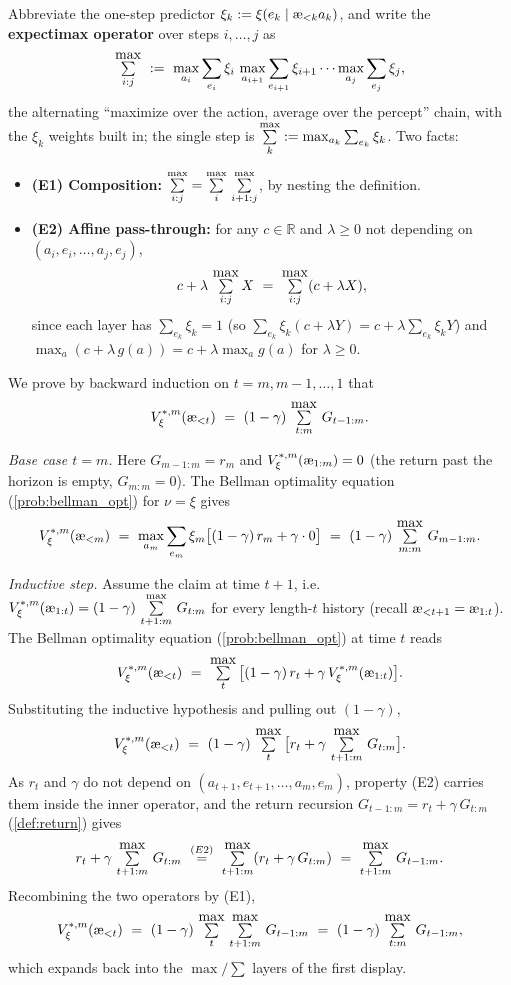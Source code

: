 \documentclass[fontsize=11pt, parskip=half]{scrartcl}
\newcommand{\exmaxsym}{\mathop{\mathchoice
  {\overset{\textstyle\max}{\textstyle\sum}}%
  {\overset{\max}{\sum}}%
  {\overset{\scriptstyle\max}{\scriptstyle\sum}}%
  {\overset{\scriptscriptstyle\max}{\scriptscriptstyle\sum}}}}
\newcommand{\exmax}{\exmaxsym\limits}
\newcommand{\aes}{\textnormal{\ae}}
\begin{document}
\begin{solution}
Abbreviate the one-step predictor $\xi_k := \xi(e_k \mid \aes_{<k} a_k)$, and write the \textbf{expectimax operator} over steps $i, \ldots, j$ as
\[
    \exmax_{i:j} ~:=~ \max_{a_i} \sum_{e_i} \xi_i\, \max_{a_{i+1}} \sum_{e_{i+1}} \xi_{i+1} \cdots \max_{a_j} \sum_{e_j} \xi_j,
\]
the alternating ``maximize over the action, average over the percept'' chain, with the $\xi_k$ weights built in; the single step is $\exmax_k := \max_{a_k} \sum_{e_k} \xi_k$. Two facts:
\begin{itemize}\itemsep=2pt
    \item \textbf{(E1) Composition:} $\exmax_{i:j} = \exmax_i\, \exmax_{i+1:j}$, by nesting the definition.
    \item \textbf{(E2) Affine pass-through:} for any $c \in \mathbb{R}$ and $\lambda \geq 0$ not depending on $(a_i, e_i, \ldots, a_j, e_j)$,
    \[
        c + \lambda\, \exmax_{i:j} X ~=~ \exmax_{i:j}(c + \lambda X),
    \]
    since each layer has $\sum_{e_k} \xi_k = 1$ (so $\sum_{e_k}\xi_k(c+\lambda Y) = c + \lambda \sum_{e_k}\xi_k Y$) and $\max_a(c + \lambda\, g(a)) = c + \lambda \max_a g(a)$ for $\lambda \geq 0$.
\end{itemize}

We prove by backward induction on $t = m, m-1, \ldots, 1$ that
\[
    V_\xi^{*,m}(\aes_{<t}) ~=~ (1-\gamma)\, \exmax_{t:m}\, G_{t-1:m}.
\]

\emph{Base case $t = m$.} Here $G_{m-1:m} = r_m$ and $V_\xi^{*,m}(\aes_{1:m}) = 0$ (the return past the horizon is empty, $G_{m:m} = 0$). The Bellman optimality equation (\cref{prob:bellman_opt}) for $\nu = \xi$ gives
\[
    V_\xi^{*,m}(\aes_{<m}) ~=~ \max_{a_m} \sum_{e_m} \xi_m \big[(1-\gamma)\, r_m + \gamma \cdot 0\big] ~=~ (1-\gamma)\, \exmax_{m:m}\, G_{m-1:m}.
\]

\emph{Inductive step.} Assume the claim at time $t+1$, i.e.\ $V_\xi^{*,m}(\aes_{1:t}) = (1-\gamma)\, \exmax_{t+1:m}\, G_{t:m}$ for every length-$t$ history (recall $\aes_{<t+1} = \aes_{1:t}$). The Bellman optimality equation (\cref{prob:bellman_opt}) at time $t$ reads
\[
    V_\xi^{*,m}(\aes_{<t}) ~=~ \exmax_t \big[(1-\gamma)\, r_t + \gamma\, V_\xi^{*,m}(\aes_{1:t})\big].
\]
Substituting the inductive hypothesis and pulling out $(1-\gamma)$,
\[
    V_\xi^{*,m}(\aes_{<t}) ~=~ (1-\gamma)\, \exmax_t \big[r_t + \gamma\, \exmax_{t+1:m}\, G_{t:m}\big].
\]
As $r_t$ and $\gamma$ do not depend on $(a_{t+1}, e_{t+1}, \ldots, a_m, e_m)$, property (E2) carries them inside the inner operator, and the return recursion $G_{t-1:m} = r_t + \gamma\, G_{t:m}$ (\cref{def:return}) gives
\[
    r_t + \gamma\, \exmax_{t+1:m}\, G_{t:m} ~\overset{(E2)}{=}~ \exmax_{t+1:m}(r_t + \gamma\, G_{t:m}) ~=~ \exmax_{t+1:m}\, G_{t-1:m}.
\]
Recombining the two operators by (E1),
\[
    V_\xi^{*,m}(\aes_{<t}) ~=~ (1-\gamma)\, \exmax_t\, \exmax_{t+1:m}\, G_{t-1:m} ~=~ (1-\gamma)\, \exmax_{t:m}\, G_{t-1:m},
\]
which expands back into the $\max/\sum$ layers of the first display.


\end{solution}
\end{document}
